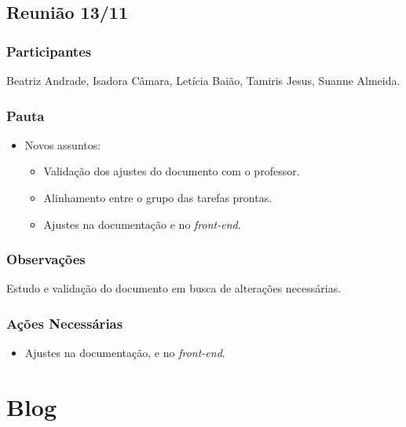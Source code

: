 \begin{apendicesenv}
\section*{Reunião 13/11}

\subsection*{Participantes}
Beatriz Andrade, Isadora Câmara, Letícia Baião, Tamiris Jesus, Suanne Almeida.

\subsection*{Pauta}
\begin{itemize}
    \item Novos assuntos:
    \begin{itemize}
        \item Validação dos ajustes do documento com o professor.
        \item Alinhamento entre o grupo das tarefas prontas.
        \item Ajustes na documentação e no \textit{front-end}.
    \end{itemize}
\end{itemize}

\subsection*{Observações}
Estudo e validação do documento em busca de alterações necessárias.

\subsection*{Ações Necessárias}
\begin{itemize}
    \item Ajustes na documentação, e no \textit{front-end}.
\end{itemize}

\chapter{Blog}
\label{apendice_k}

\end{apendicesenv}
